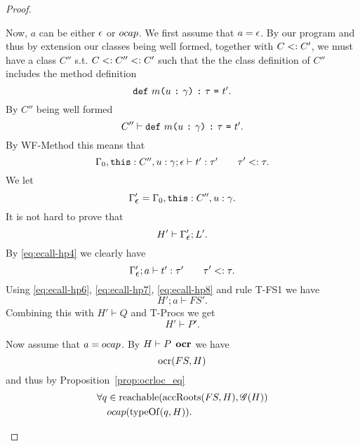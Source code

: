 \begin{proof}
\begin{description}
\begin{description}
          Now, $a$ can be either $\mbox{$\epsilon$}$ or $\mbox{$ocap$}$. We first assume that $a =
          \mbox{$\epsilon$}$.
          By our program and thus by extension our classes being well formed, together
          with $C <: C'$, we must have a class $C''$ s.t. $C <: C'' <:
          C'$ such that the the class definition of $C''$ includes the method
          definition
          \begin{equation*}
            \mbox{\mdseries\texttt{def}~$m$\texttt{(}$u$~\texttt{:}~$\gamma$\texttt{)}~\texttt{:}~$\tau$~\texttt{=}~$t'$}.
          \end{equation*}
          By $C''$ being well formed
          \begin{equation}
            C'' \vdash \mbox{\mdseries\texttt{def}~$m$\texttt{(}$u$~\texttt{:}~$\gamma$\texttt{)}~\texttt{:}~$\tau$~\texttt{=}~$t'$}.
          \end{equation}
          By {\sc WF-Method} this means that
          \begin{equation} \label{eq:ecall-hp4}
            \mbox{$\Gamma_0,\mbox{\mdseries\texttt{this}}: C'', u: \gamma;\mbox{$\epsilon$}\vdash t':\tau'$}
            \quad\quad \tau' <: \tau.
          \end{equation}
          We let
          \begin{equation}
            \Gamma_{\mbox{$\epsilon$}}' = \Gamma_0, \mbox{\mdseries\texttt{this}}: C'', u: \gamma.
          \end{equation}
          It is not hard to prove that 
          \begin{equation} \label{eq:ecall-hp7}
            H' \vdash \Gamma_{\mbox{$\epsilon$}}'; L'.
          \end{equation}
          By \eqref{eq:ecall-hp4} we clearly have
          \begin{equation} \label{eq:ecall-hp8}
            \mbox{$\Gamma_{\mbox{$\epsilon$}}';a\vdash t':\tau'$} \quad\quad \tau' <: \tau.
          \end{equation}
          Using  \eqref{eq:ecall-hp6}, \eqref{eq:ecall-hp7},
          \eqref{eq:ecall-hp8} and rule {\sc T-FS1} we have
          \begin{equation}
            H';a \vdash FS'.
          \end{equation}
          Combining this with $H' \vdash Q$ and {\sc T-Procs} we get
          \begin{equation}
            H' \vdash P'.
          \end{equation}

          Now assume that $a = \mbox{$ocap$}$. By $H \vdash P \:\: \mbox{\bf ocr}$ we have
          \begin{equation}
            \mbox{$\mathrm{ocr}$}(FS, H)
          \end{equation}
          and thus by Proposition~\ref{prop:ocrloc_eq}
          \begin{equation}
            \begin{aligned}
              \forall q &\in \mbox{$\mathrm{reachable}$}(\mbox{$\mathrm{accRoots}$}(FS, H), \mathscr{G}(H)) \\
              & \mbox{$ocap$}(\mbox{$\mathrm{typeOf}$}(q, H)).
            \end{aligned}
          \end{equation}
          

\end{description}
\end{description}
\end{proof}
